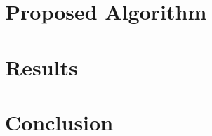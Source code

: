 \documentclass[conference]{IEEEtran}
\begin{document}
\section{Proposed Algorithm} \label{algo}


\section{Results} \label{results}


\section{Conclusion}   \label{conclusion}





 \balance
{\footnotesize}
\end{document}
